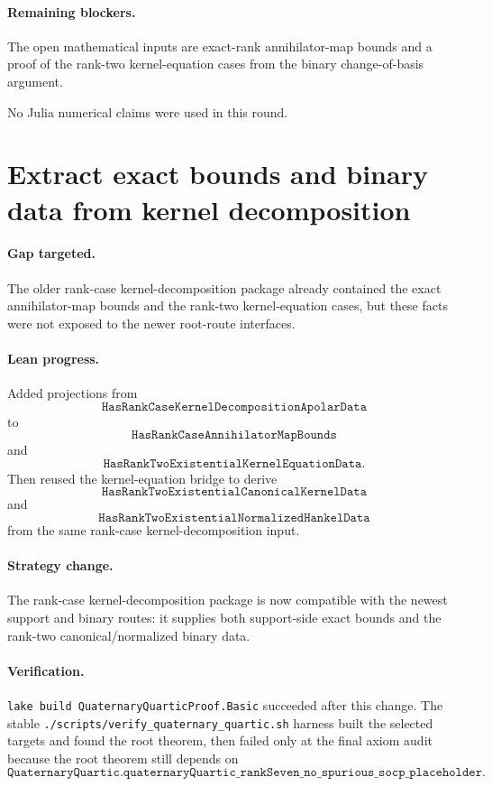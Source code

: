 \documentclass[11pt]{article}
\begin{document}
\paragraph{Remaining blockers.}
The open mathematical inputs are exact-rank annihilator-map bounds and a proof
of the rank-two kernel-equation cases from the binary change-of-basis argument.

No Julia numerical claims were used in this round.

\section*{Extract exact bounds and binary data from kernel decomposition}

\paragraph{Gap targeted.}
The older rank-case kernel-decomposition package already contained the exact
annihilator-map bounds and the rank-two kernel-equation cases, but these facts
were not exposed to the newer root-route interfaces.

\paragraph{Lean progress.}
Added projections from
\[
\texttt{HasRankCaseKernelDecompositionApolarData}
\]
to
\[
\texttt{HasRankCaseAnnihilatorMapBounds}
\]
and
\[
\texttt{HasRankTwoExistentialKernelEquationData}.
\]
Then reused the kernel-equation bridge to derive
\[
\texttt{HasRankTwoExistentialCanonicalKernelData}
\]
and
\[
\texttt{HasRankTwoExistentialNormalizedHankelData}
\]
from the same rank-case kernel-decomposition input.

\paragraph{Strategy change.}
The rank-case kernel-decomposition package is now compatible with the newest
support and binary routes: it supplies both support-side exact bounds and the
rank-two canonical/normalized binary data.

\paragraph{Verification.}
\texttt{lake build QuaternaryQuarticProof.Basic} succeeded after this change.
The stable \texttt{./scripts/verify\_quaternary\_quartic.sh} harness built the
selected targets and found the root theorem, then failed only at the final axiom
audit because the root theorem still depends on
\[
\texttt{QuaternaryQuartic.quaternaryQuartic\_rankSeven\_no\_spurious\_socp\_placeholder}.
\]
\end{document}
